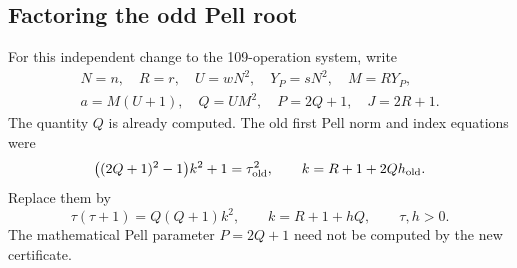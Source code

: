 \subsection{Factoring the odd Pell root}

For this independent change to the 109-operation system, write
\[
\begin{gathered}
 N=n,\quad R=r,\quad U=wN^2,\quad Y_P=sN^2,
 \quad M=RY_P,\\
 a=M(U+1),\quad Q=UM^2,
 \quad P=2Q+1,\quad J=2R+1.
\end{gathered}
\]
The quantity $Q$ is already computed. The old first Pell norm
and index equations were
\[
 \bigl((2Q+1)^2-1\bigr)k^2+1=\tau_{\rm old}^2,
 \qquad k=R+1+2Qh_{\rm old}.
\]
Replace them by
\begin{equation}\label{eq:triangular-pell}
 \tau(\tau+1)=Q(Q+1)k^2,
 \qquad k=R+1+hQ,
 \qquad \tau,h>0.
\end{equation}
The mathematical Pell parameter $P=2Q+1$ need not be computed
by the new certificate.

